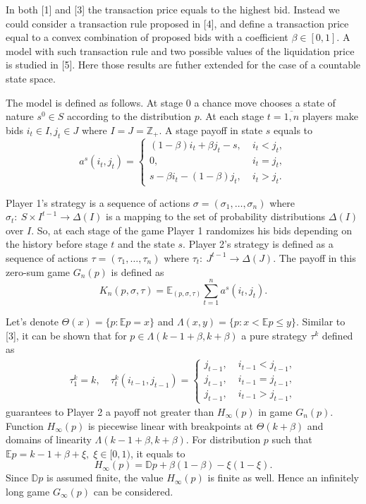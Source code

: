 In both [1] and [3] the transaction price equals to the highest bid. Instead we
could consider a transaction rule proposed in [4], and define a transaction
price equal to a convex combination of proposed bids with a coefficient $\beta
\in [0, 1]$. A model with such transaction rule and two possible values of the
liquidation price is studied in [5]. Here those results are futher extended for
the case of a countable state space.

The model is defined as follows. At stage 0 a chance move chooses a state of
nature $s^0 \in S$ according to the distribution $p$. At each stage $t =
\overline{1,n}$ players make bids $i_t \in I, j_t \in J$ where $I = J =
\mathbb{Z}_+$. A stage payoff in state $s$ equals to
\begin{equation*}
  a^s(i_t, j_t) =
  \begin{cases}
    (1-\beta) i_t + \beta j_t - s, &\; i_t < j_t,\\
    0, &\; i_t = j_t,\\
    s - \beta i_t - (1-\beta) j_t, &\; i_t > j_t.
  \end{cases}
\end{equation*}

Player 1's strategy is a sequence of actions $\sigma = (\sigma_1, \ldots,
\sigma_n)$ where $\sigma_t:~S \times I^{t-1} \rightarrow \Delta(I)$ is a mapping
to the set of probability distributions $\Delta(I)$ over $I$. So, at each stage
of the game Player 1 randomizes his bids depending on the history before stage
$t$ and the state $s$. Player 2's strategy is defined as a sequence of actions
$\tau = (\tau_1, \ldots, \tau_n)$ where $\tau_t:~J^{t-1} \rightarrow \Delta(J)$.
The payoff in this zero-sum game $G_n(p)$ is defined as
\begin{equation*}
  K_n(p, \sigma, \tau) = \mathbb{E}_{(p, \sigma, \tau)} \sum_{t=1}^n a^s(i_t,j_t).
\end{equation*}

Let's denote $\Theta(x) = \{p: \mathbb{E} p = x\}$ and $\Lambda(x, y) = \{p: x <
\mathbb{E}p \leq y \}$. Similar to [3], it can be shown that for $p \in
\Lambda(k-1+\beta, k+\beta)$ a pure strategy $\tau^k$ defined as
\begin{gather}
  \tau_1^k = k, \quad \tau_t^k(i_{t-1}, j_{t-1}) =
  \begin{cases}
    j_{t-1}, &\; i_{t-1} < j_{t-1},\\
    j_{t-1}, &\; i_{t-1} = j_{t-1},\\
    j_{t-1}, &\; i_{t-1} > j_{t-1},
  \end{cases}
\end{gather}
guarantees to Player 2 a payoff not greater than $H_\infty(p)$ in game $G_n(p)$.
Function $H_\infty(p)$ is piecewise linear with breakpoints at $\Theta(k+\beta)$
and domains of linearity $\Lambda(k-1+\beta, k+\beta)$. For distribution $p$
such that $\mathbb{E} p = k - 1 + \beta + \xi, \; \xi \in [0, 1)$, it equals to
\begin{equation}
  H_\infty(p) = \mathbb{D} p + \beta(1-\beta) -\xi(1-\xi).
\end{equation}
Since $\mathbb{D}p$ is assumed finite, the value $H_\infty(p)$ is finite as
well. Hence an infinitely long game $G_\infty(p)$ can be considered.

